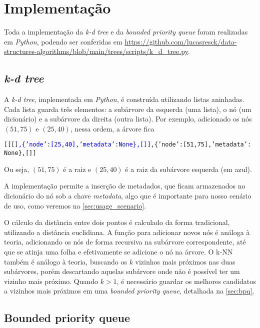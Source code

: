 \section{Implementação}

    Toda a implementação da \textit{k-d tree} e da \textit{bounded priority queue} foram realizadas em \textit{Python}, podendo ser conferidas em \url{https://github.com/lucasresck/data-structures-algorithms/blob/main/trees/scripts/k_d_tree.py}.

    \subsection{\textit{k-d tree}}

        A \textit{k-d tree}, implementada em \textit{Python}, é construída utilizando listas aninhadas. Cada lista guarda três elementos: a subárvore da esquerda (uma lista), o nó (um dicionário) e a subárvore da direita (outra lista). Por exemplo, adicionado os nós $(51, 75)$ e $(25, 40)$, nessa ordem, a árvore fica        
        \begin{alltt}
[\textcolor{blue}{[[], \{'node': [25, 40], 'metadata': None\}, []]}, \{'node': [51, 75], 'metadata':
None\}, []]
        \end{alltt}
        Ou seja, $(51, 75)$ é a raiz e $(25, 40)$ é a raiz da subárvore esquerda (em azul).

        A implementação permite a inserção de metadados, que ficam armazenados no dicionário do nó sob a chave \textit{metadata}, algo que é importante para nosso cenário de uso, como veremos na \autoref{sec:usage_scenario}.
        
        O cálculo da distância entre dois pontos é calculado da forma tradicional, utilizando a distância euclidiana. 
        A função para adicionar novos nós é análoga à teoria, adicionando os nós de forma recursiva na subárvore correspondente, até que se atinja uma folha e efetivamente se adicione o nó na árvore. O k-NN também é análogo à teoria, buscando os $k$ vizinhos mais próximos nas duas subárvores, porém descartando aquelas subárvore onde não é possível ter um vizinho mais próximo. Quando $k > 1$, é necessário guardar os melhores candidatos a vizinhos mais próximos em uma \textit{bounded priority queue}, detalhada na \autoref{sec:bpq}.

    \subsection{Bounded priority queue}
        \label{sec:bpq}

